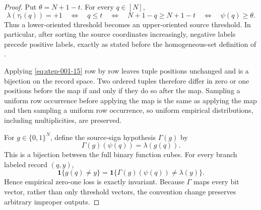 \begin{proof}

Put \(\theta=N+1-t\). For every \(q \in [N]\),
\[
\lambda(\tau_t(q))=+1
\quad\Longleftrightarrow\quad
q\le t
\quad\Longleftrightarrow\quad
N+1-q\ge N+1-t
\quad\Longleftrightarrow\quad
\psi(q)\ge\theta.
\tag{16}\label{eq:step-001-16}
\]
Thus a lower-oriented threshold becomes an upper-oriented source threshold. In particular, after sorting the source coordinates increasingly, negative labels precede positive labels, exactly as stated before the homogeneous-set definition of \citet{alonEtAl2018private}.

Applying \eqref{eq:step-001-15} row by row leaves tuple positions unchanged and is a bijection on the record space. Two ordered tuples therefore differ in zero or one positions before the map if and only if they do so after the map. Sampling a uniform row occurrence before applying the map is the same as applying the map and then sampling a uniform row occurrence, so uniform empirical distributions, including multiplicities, are preserved.

For \(g \in \{0,1\}^N\), define the source-sign hypothesis \(\Gamma(g)\) by
\[
\Gamma(g)(\psi(q))=\lambda(g(q)).
\tag{17}\label{eq:step-001-17}
\]
This is a bijection between the full binary function cubes. For every branch labeled record \((q,y)\),
\[
\mathbf 1\{g(q)\ne y\}
=\mathbf 1\{\Gamma(g)(\psi(q))\ne\lambda(y)\}.
\tag{18}\label{eq:step-001-18}
\]
Hence empirical zero-one loss is exactly invariant. Because \(\Gamma\) maps every bit vector, rather than only threshold vectors, the convention change preserves arbitrary improper outputs.

\end{proof}

